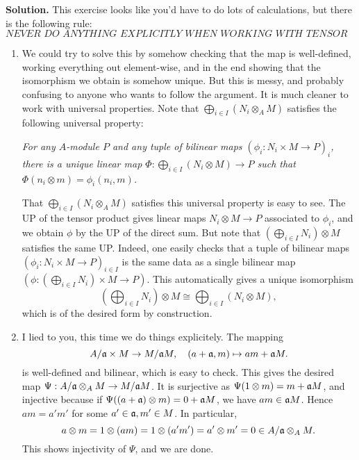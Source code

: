 \documentclass[a4paper,11pt]{article}
\begin{document}
\textbf{Solution.} 
This exercise looks like you'd have to do lots of calculations, but there is the
following rule:
\begin{equation*}
    \textit{NEVER DO ANYTHING EXPLICITLY WHEN WORKING WITH TENSOR PRODUCTS.}
\end{equation*}
\begin{enumerate}
    \item We could try to solve this by somehow checking that the map is
        well-defined, working everything out element-wise, and in the end
        showing that the isomorphism we obtain is somehow unique. But this is
        messy, and probably confusing to anyone who wants to follow the
        argument. It is much cleaner to work with universal properties. 
        Note that $\bigoplus_{i \in I} (N_i \otimes_A M)$ satisfies the
        following universal
        property: 
        \begin{center}
        \textit{For any $A$-module $P$ and any tuple of bilinear maps
        $(\phi_i: N_i \times M \to P)_i$,} \\ \textit{there is a unique linear map 
        $\Phi: \bigoplus_{i \in I} (N_i \otimes M) \to P$ such that 
        $\Phi(n_i \otimes m) = \phi_i(n_i, m)$.}
        \end{center}
        That $\bigoplus_{i \in I} (N_i \otimes_A M)$ satisfies this 
        universal property is easy to see. The UP of the tensor product
        gives linear maps $N_i \otimes M \to P$ associated to $\phi_i$, and
        we obtain $\phi$ by the UP of the direct sum. But note that 
        $(\bigoplus_{i \in I} N_i) \otimes M$ satisfies the same UP. Indeed, one 
        easily checks that a tuple of bilinear maps $(\phi_i: N_i \times M \to
        P)_{i \in I}$ is the same data as a single bilinear map $(\phi:
        (\bigoplus_{i \in I} N_i) \times M \to P)$. 
        This automatically gives a unique isomorphism 
        \begin{equation*}
            (\bigoplus_{i \in I} N_i) \otimes M   \cong
            \bigoplus_{i \in I} (N_i \otimes M),
        \end{equation*}
        which is of the desired form by construction.

    \item I lied to you, this time we do things explicitely. The mapping
            \begin{equation*}
                A/\mathfrak{a} \times M \to M / \mathfrak{a} M, \quad (a + \mathfrak{a}, m) \mapsto 
                am + \mathfrak{a} M.
            \end{equation*}
            is well-defined and bilinear, which is easy to check. This gives the
            desired map $\Psi: A/\mathfrak{a} \otimes_A M \to M/\mathfrak{a} M$. It is surjective 
            as $\Psi(1 \otimes m) = m + \mathfrak{a} M$, and injective because if 
            $\Psi((a + \mathfrak{a}) \otimes m) = 0 + \mathfrak{a} M$, we have $am \in \mathfrak{a} M$.
            Hence $am = a' m'$ for some $a' \in \mathfrak{a}, m' \in M$. In particular,
            $$a \otimes m = 1 \otimes (am) = 1 \otimes (a' m') = a' \otimes m' = 0
            \in A/\mathfrak{a} \otimes_A M.$$ 
            This shows injectivity of $\Psi$, and we are done.



\end{enumerate}
\end{document}
